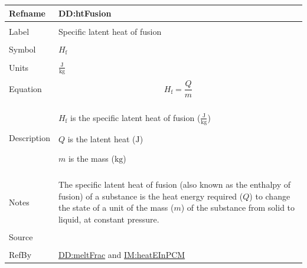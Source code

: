 \documentclass[12pt]{article}
\begin{document}
\vspace{\baselineskip}
\noindent
\begin{minipage}{\textwidth}
\begin{tabular}{>{\raggedright}p{}>{\raggedright\arraybackslash}p{}}
\toprule \textbf{Refname} & \textbf{DD:htFusion}
\label{DD:htFusion}
\\ \midrule \\
Label & Specific latent heat of fusion
        
\\ \midrule \\
Symbol & ${H_{\text{f}}}$
         
\\ \midrule \\
Units & $\frac{\text{J}}{\text{kg}}$
        
\\ \midrule \\
Equation & \begin{displaymath}
           {H_{\text{f}}}=\frac{Q}{m}
           \end{displaymath}
\\ \midrule \\
Description & \begin{symbDescription}
              \item{${H_{\text{f}}}$ is the specific latent heat of fusion ($\frac{\text{J}}{\text{kg}}$)}
              \item{$Q$ is the latent heat (${\text{J}}$)}
              \item{$m$ is the mass (${\text{kg}}$)}
              \end{symbDescription}
\\ \midrule \\
Notes & The specific latent heat of fusion (also known as the enthalpy of fusion) of a substance is the heat energy required ($Q$) to change the state of a unit of the mass ($m$) of the substance from solid to liquid, at constant pressure.
        
\\ \midrule \\
Source & \cite[(pg. 282)]{bueche1986}
         
\\ \midrule \\
RefBy & \hyperref[DD:meltFrac]{DD:meltFrac} and \hyperref[IM:heatEInPCM]{IM:heatEInPCM}
        
\\ \bottomrule
\end{tabular}
\end{minipage}
\end{document}
